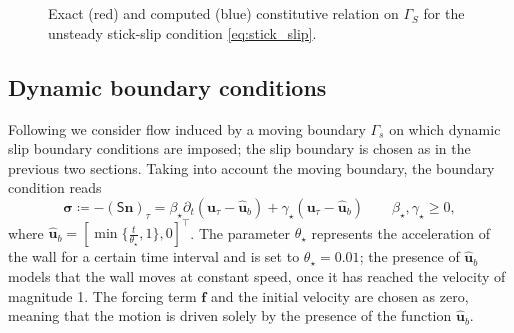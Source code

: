 \documentclass[reqno,a4paper]{amsart}
\def\tens#1{\pmb{\mathsf{#1}}}
\def\vec#1{\boldsymbol{#1}}
\def\bf{\vec{f}}
\def\bn{\vec{n}}
\def\bu{\vec{u}}
\def\bsigma{\vec{\sigma}}
\def\BS{\tens{S}}
\begin{document}
	\begin{figure}
		\centering
		\\
		\\
		\caption{Exact (red) and computed (blue) constitutive relation on $\Gamma_S$ for the unsteady stick-slip condition \eqref{eq:stick_slip}.}%
		\label{fig:CR_stick-slip}
	\end{figure}
	
	\subsection{Dynamic boundary conditions}
	\label{sec:num-exp-3}
	Following \cite{Abbatiello2021} we consider flow induced by a moving boundary $\Gamma_s$ on which dynamic slip boundary conditions are imposed; 
	the slip boundary is chosen as in the previous two sections.
	Taking into account the moving boundary, the boundary condition  reads
	\begin{equation}\label{eq:linear_dynamic_BC}
		\bsigma \coloneqq -(\BS\bn)_\tau = \beta_\star \partial_t(\bu_\tau - \hat{\bu}_b) + \gamma_\star (\bu_\tau - \hat{\bu}_b)
		\qquad
		\beta_\star,\gamma_\star\geq 0,
	\end{equation}
	where $\hat{\bu}_b= [\min\{\tfrac{t}{\theta_\star},1\}, 0]^\top$. 
	The parameter $\theta_\star$ represents the acceleration of the wall for 
	a certain time interval and is set to $\theta_\star=0.01$; 
	the presence of $\hat{\bu}_b$ models that the wall moves at constant speed, once it has reached the velocity of magnitude 1.
	The forcing term 
	$\bf$ and the initial velocity are chosen as zero, meaning that the motion is driven solely by the presence of the function $\hat{\bu}_b$. 
	
\end{document}
